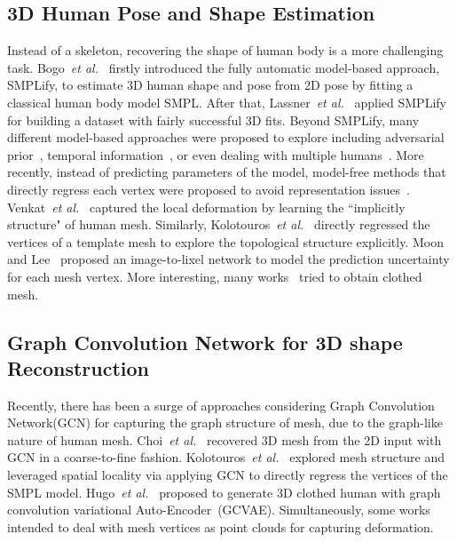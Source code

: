 \documentclass[sigplan]{acmart}
\def\etal{\emph{et al.}}
\begin{document}
\subsection{3D Human Pose and Shape Estimation}
\label{relate:3d}
Instead of a skeleton, recovering the shape of human body is a more challenging task. Bogo~\etal~\cite{bogo2016keep} firstly introduced the fully automatic model-based approach, SMPLify, to estimate 3D human shape and pose from 2D pose by fitting a classical human body model SMPL. After that, Lassner~\etal~\cite{lassner2017unite} applied SMPLify for building a dataset with fairly successful 3D fits. Beyond SMPLify, many different model-based approaches were proposed to explore including adversarial prior~\cite{kanazawa2018end-to-end,kocabas2019vibe}, temporal information~\cite{arnab2019exploiting,KanazawaVideo}, or even dealing with multiple humans~\cite{Zanfir_2018_CVPR,jiang2020coherent}. More recently, instead of predicting parameters of the model, model-free methods that directly regress each vertex were proposed to avoid representation issues~\cite{3dbaseline,pavlakos2018learning}. Venkat~\etal~\cite{Venkat_2019_ICCV} captured the local deformation by learning the ``implicitly structure" of human mesh. Similarly, Kolotouros~\etal~\cite{kolotouros2019convolutional} directly regressed the vertices of a template mesh to explore the topological structure explicitly. Moon and Lee~\cite{Moon_2020_ECCV_I2L-MeshNet} proposed an image-to-lixel network to model the prediction uncertainty for each mesh vertex. More interesting, many works~\cite{Zhu_2019_CVPR,bhatnagar2020ipnet,Habermann_2020_CVPR} tried to obtain clothed mesh.

\subsection{Graph Convolution Network for 3D shape Reconstruction}
\label{relate:gcn}
Recently, there has been a surge of approaches considering Graph Convolution Network(GCN) for capturing the graph structure of mesh, due to the graph-like nature of human mesh. Choi~\etal~\cite{Choi_2020_ECCV_Pose2Mesh} recovered 3D mesh from the 2D input with GCN in a coarse-to-fine fashion. Kolotouros~\etal~\cite{kolotouros2019convolutional} explored mesh structure and leveraged spatial locality via applying GCN to directly regress the vertices of the SMPL model. Hugo~\etal~\cite{cloth3d} proposed to generate 3D clothed human with graph convolution variational Auto-Encoder~(GCVAE). Simultaneously, some works~\cite{Venkat_2019_ICCV,GabeurFMSR2019} intended to deal with mesh vertices as point clouds for capturing deformation.
\end{document}
